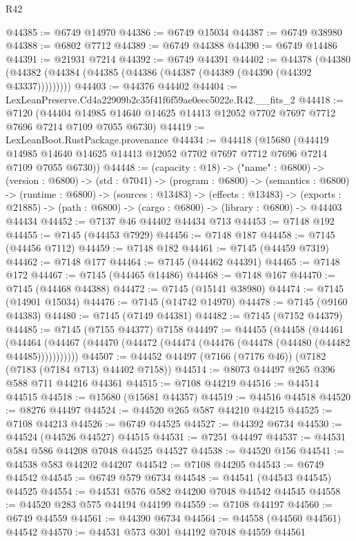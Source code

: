 \begin{lexlean}{R42}
\begin{coremodule}
{@44385 := @6749 @14970
@44386 := @6749 @15034
@44387 := @6749 @38980
@44388 := @6802 @7712
@44389 := @6749 @44388
@44390 := @6749 @14486
@44391 := @21931 @7214
@44392 := @6749 @44391
@44402 := @44378
    (@44380 (@44382 (@44384 (@44385 (@44386 (@44387 (@44389 (@44390 (@44392 @43337)))))))))
@44403 := @44376 @44402
@44404 := LexLeanPreserve.Cd4a22909b2c35f41f6f59ae0eec5022e.R42.__fits_2
@44418 := @7120
    (@44404 @14985 @14640 @14625 @14413 @12052 @7702 @7697 @7712 @7696 @7214 @7109 @7055 @6730)
@44419 := LexLeanBoot.RustPackage.provenance
@44434 := @44418
    (@15680
      (@44419 @14985 @14640 @14625 @14413 @12052 @7702 @7697 @7712 @7696 @7214 @7109 @7055 @6730))
@44448 := (capacity : @18) ->
  ("name" : @6800) ->
  (version : @6800) ->
  (std : @7041) ->
  (program : @6800) ->
  (semantics : @6800) ->
  (runtime : @6800) ->
  (sources : @13483) ->
  (effects : @13483) ->
  (exports : @21885) -> (path : @6800) -> (cargo : @6800) -> (library : @6800) -> @44403 @44434
@44452 := @7137 @46 @44402 @44434 @713
@44453 := @7148 @192
@44455 := @7145 (@44453 @7929)
@44456 := @7148 @187
@44458 := @7145 (@44456 @7112)
@44459 := @7148 @182
@44461 := @7145 (@44459 @7319)
@44462 := @7148 @177
@44464 := @7145 (@44462 @44391)
@44465 := @7148 @172
@44467 := @7145 (@44465 @14486)
@44468 := @7148 @167
@44470 := @7145 (@44468 @44388)
@44472 := @7145 (@15141 @38980)
@44474 := @7145 (@14901 @15034)
@44476 := @7145 (@14742 @14970)
@44478 := @7145 (@9160 @44383)
@44480 := @7145 (@7149 @44381)
@44482 := @7145 (@7152 @44379)
@44485 := @7145 (@7155 @44377) @7158
@44497 := @44455
    (@44458
      (@44461
        (@44464 (@44467 (@44470 (@44472 (@44474 (@44476 (@44478 (@44480 (@44482 @44485)))))))))))
@44507 := @44452 @44497 (@7166 (@7176 @46)) (@7182 (@7183 (@7184 @713) @44402 @7158))
@44514 := @8073 @44497 @265 @396 @588 @711 @44216 @44361
@44515 := @7108 @44219
@44516 := @44514 @44515
@44518 := @15680 (@15681 @44357)
@44519 := @44516 @44518
@44520 := @8276 @44497
@44524 := @44520 @265 @587 @44210 @44215
@44525 := @7108 @44213
@44526 := @6749 @44525
@44527 := @44392 @6734
@44530 := @44524 (@44526 @44527) @44515
@44531 := @7251 @44497
@44537 := @44531 @584 @586 @44208 @7048 @44525 @44527
@44538 := @44520 @156
@44541 := @44538 @583 @44202 @44207
@44542 := @7108 @44205
@44543 := @6749 @44542
@44545 := @6749 @579 @6734
@44548 := @44541 (@44543 @44545) @44525
@44554 := @44531 @576 @582 @44200 @7048 @44542 @44545
@44558 := @44520 @283 @575 @44194 @44199
@44559 := @7108 @44197
@44560 := @6749 @44559
@44561 := @44390 @6734
@44564 := @44558 (@44560 @44561) @44542
@44570 := @44531 @573 @301 @44192 @7048 @44559 @44561
}
\end{coremodule}
\end{lexlean}
